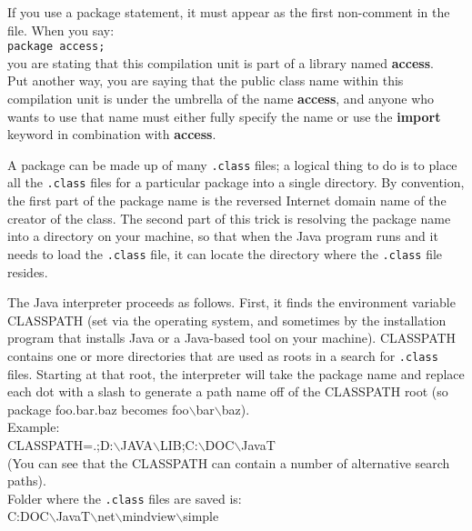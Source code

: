 \documentclass[10pt,letterpaper]{report}
\begin{document}
If you use a package statement, it must appear as the first non-comment in the file. When you say:\\

\texttt{package access;}\\

you are stating that this compilation unit is part of a library named \textbf{access}.\\
Put another way, you are saying that the public class name within this compilation unit is under the umbrella of the name \textbf{access}, and anyone who wants to use that name must either fully specify the name or use the \textbf{import} keyword in combination with \textbf{access}.

A package can be made up of many \texttt{.class} files; a logical thing to do is to place all the \texttt{.class} files for a particular package into a single directory.
By convention, the first part of the package name is the reversed Internet domain name of the creator of the class. The second part of this trick is resolving the package name into a directory on your machine, so that when the Java program runs and it needs to load the \texttt{.class} file, it can locate the directory where the \texttt{.class} file resides.

The Java interpreter proceeds as follows. First, it finds the environment variable CLASSPATH (set via the operating system, and sometimes by the installation program that installs Java or a Java-based tool on your machine). CLASSPATH contains one or more directories that are used as roots in a search for \texttt{.class} files. Starting at that root, the interpreter will take the package name and replace each dot with a slash to generate a path name off of the CLASSPATH root (so package foo.bar.baz becomes foo$\backslash$bar$\backslash$baz).\\

Example:\\

CLASSPATH=.;D:$\backslash$JAVA$\backslash$LIB;C:$\backslash$DOC$\backslash$JavaT\\

(You can see that the CLASSPATH can contain a number of alternative search paths).\\

Folder where the \texttt{.class} files are saved is:\\

C:DOC$\backslash$JavaT$\backslash$net$\backslash$mindview$\backslash$simple
\end{document}
